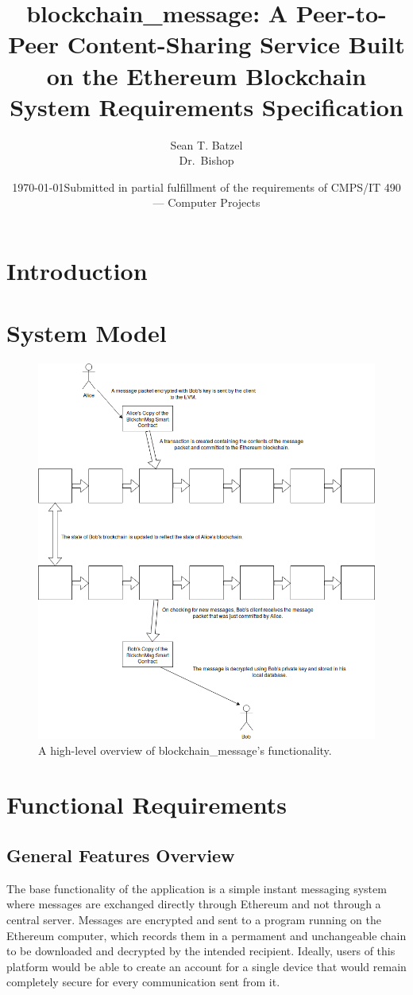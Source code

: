 \documentclass[titlepage]{report}
\title{blockchain\_message: A Peer-to-Peer Content-Sharing Service Built on the Ethereum Blockchain\\\large System Requirements Specification}
\author{Sean T. Batzel\\Dr.\ Bishop}
\date{\today\endgraf\bigskip Submitted in partial fulfillment of the requirements of CMPS/IT 490 --- Computer Projects}
\begin{document}
\maketitle

\tableofcontents

\nocite{*}

\section{Introduction}

\pagebreak
\section{System Model}
\begin{figure}[H]
\centering
\includegraphics[width=1.3\textwidth]{diagram}
\caption{A high-level overview of blockchain\_message's functionality.}
\end{figure}
\pagebreak

\section{Functional Requirements}
\subsection{General Features Overview}
The base functionality of the application is a simple instant messaging system where messages are exchanged directly through \gls{Ethereum} and not through a central server. Messages are encrypted and sent to a program running on the Ethereum computer, which records them in a permament and unchangeable chain to be downloaded and decrypted by the intended recipient. Ideally, users of this platform would be able to create an account for a single device that would remain completely secure for every communication sent from it.
\end{document}
